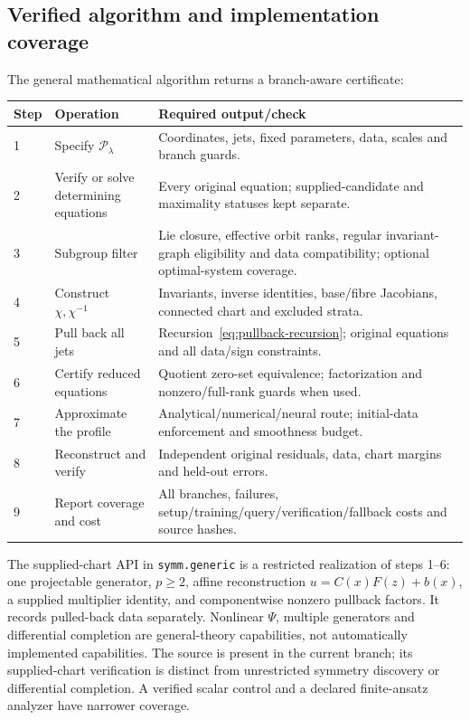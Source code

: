 \documentclass[11pt]{article}
\theoremstyle{definition}
\begin{document}
\subsection{Verified algorithm and implementation coverage}
\label{sec:algorithm-core}
The general mathematical algorithm returns a branch-aware certificate:
\begin{center}\small
\renewcommand{\arraystretch}{1.13}
\begin{tabularx}{\linewidth}{@{}p{.8cm}p{3.2cm}X@{}}
\toprule
Step & Operation & Required output/check \\
\midrule
1 & Specify $\mathcal P_\lambda$ & Coordinates, jets, fixed parameters, data, scales and branch guards. \\
2 & Verify or solve determining equations & Every original equation; supplied-candidate and maximality statuses kept separate. \\
3 & Subgroup filter & Lie closure, effective orbit ranks, regular invariant-graph eligibility and data compatibility; optional optimal-system coverage. \\
4 & Construct $\chi,\chi^{-1}$ & Invariants, inverse identities, base/fibre Jacobians, connected chart and excluded strata. \\
5 & Pull back all jets & Recursion~\eqref{eq:pullback-recursion}; original equations and all data/sign constraints. \\
6 & Certify reduced equations & Quotient zero-set equivalence; factorization and nonzero/full-rank guards when used. \\
7 & Approximate the profile & Analytical/numerical/neural route; initial-data enforcement and smoothness budget. \\
8 & Reconstruct and verify & Independent original residuals, data, chart margins and held-out errors. \\
9 & Report coverage and cost & All branches, failures, setup/training/query/verification/fallback costs and source hashes. \\
\bottomrule
\end{tabularx}
\end{center}

The supplied-chart API in \texttt{symm.generic} is a restricted realization of steps
1--6: one projectable generator, $p\ge2$, affine reconstruction
$u=C(x)F(z)+b(x)$, a supplied multiplier identity, and componentwise
nonzero pullback factors. It records pulled-back data separately. Nonlinear
$\Psi$, multiple generators and differential completion are general-theory
capabilities, not automatically implemented capabilities. The source is present
in the current branch; its supplied-chart verification is distinct from
unrestricted symmetry discovery or differential completion. A verified scalar control and a
declared finite-ansatz analyzer have narrower coverage.
\end{document}
